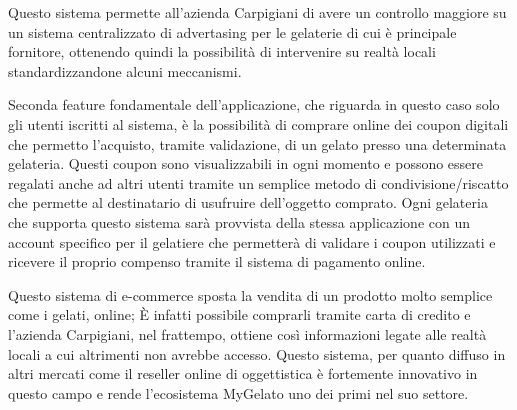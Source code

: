 Questo sistema permette all'azienda Carpigiani di avere un controllo maggiore su un sistema centralizzato di advertasing per le gelaterie di cui è principale fornitore, ottenendo quindi la possibilità di intervenire su realtà locali standardizzandone alcuni meccanismi.

Seconda feature fondamentale dell'applicazione, che riguarda in questo caso solo gli utenti iscritti al sistema, è la possibilità di comprare online dei coupon digitali che permetto l'acquisto, tramite validazione, di un gelato presso una determinata gelateria.
Questi coupon sono visualizzabili in ogni momento e possono essere regalati anche ad altri utenti tramite un semplice metodo di condivisione/riscatto che permette al destinatario di usufruire dell'oggetto comprato.
Ogni gelateria che supporta questo sistema sarà provvista della stessa applicazione con un account specifico per il gelatiere che permetterà di validare i coupon utilizzati e ricevere il proprio compenso tramite il sistema di pagamento online.

Questo sistema di e-commerce sposta la vendita di un prodotto molto semplice come i gelati, online; È infatti possibile comprarli tramite carta di credito e l'azienda Carpigiani, nel frattempo, ottiene così informazioni legate alle realtà locali a cui altrimenti non avrebbe accesso.
Questo sistema, per quanto diffuso in altri mercati come il reseller online di oggettistica è fortemente innovativo in questo campo e rende l'ecosistema MyGelato uno dei primi nel suo settore.

\newpage